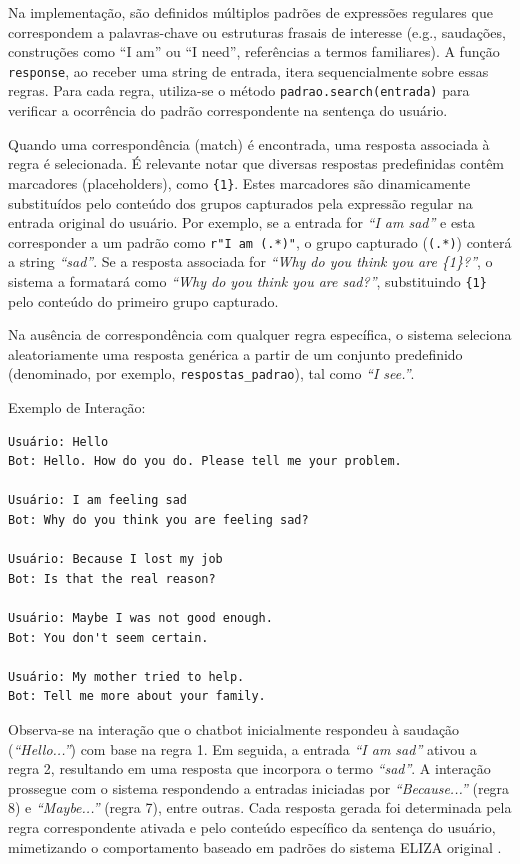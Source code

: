 \documentclass[14pt,a4paper,oneside]{book}
\begin{document}
Na implementação, são definidos múltiplos padrões de expressões regulares que correspondem a palavras-chave ou estruturas frasais de interesse (e.g., saudações, construções como ``I am'' ou ``I need'', referências a termos familiares). A função \texttt{response}, ao receber uma string de entrada, itera sequencialmente sobre essas regras. Para cada regra, utiliza-se o método \texttt{padrao.search(entrada)} para verificar a ocorrência do padrão correspondente na sentença do usuário.

Quando uma correspondência (match) é encontrada, uma resposta associada à regra é selecionada. É relevante notar que diversas respostas predefinidas contêm marcadores (placeholders), como \texttt{\{1\}}. Estes marcadores são dinamicamente substituídos pelo conteúdo dos grupos capturados pela expressão regular na entrada original do usuário. Por exemplo, se a entrada for \textit{``I am sad''} e esta corresponder a um padrão como \texttt{r"I am (.*)"}, o grupo capturado (\texttt{(.*)}) conterá a string \textit{``sad''}. Se a resposta associada for \textit{``Why do you think you are \{1\}?''}, o sistema a formatará como \textit{``Why do you think you are sad?''}, substituindo \texttt{\{1\}} pelo conteúdo do primeiro grupo capturado.

Na ausência de correspondência com qualquer regra específica, o sistema seleciona aleatoriamente uma resposta genérica a partir de um conjunto predefinido (denominado, por exemplo, \texttt{respostas\_padrao}), tal como \textit{``I see.''}.

Exemplo de Interação:

\begin{lstlisting}
Usuário: Hello
Bot: Hello. How do you do. Please tell me your problem.

Usuário: I am feeling sad
Bot: Why do you think you are feeling sad?

Usuário: Because I lost my job
Bot: Is that the real reason?

Usuário: Maybe I was not good enough.
Bot: You don't seem certain.

Usuário: My mother tried to help.
Bot: Tell me more about your family.
\end{lstlisting}

Observa-se na interação que o chatbot inicialmente respondeu à saudação (\textit{``Hello...''}) com base na regra 1. Em seguida, a entrada \textit{``I am sad''} ativou a regra 2, resultando em uma resposta que incorpora o termo \textit{``sad''}. 
A interação prossegue com o sistema respondendo a entradas iniciadas por \textit{``Because...''} (regra 8) e \textit{``Maybe...''} (regra 7), entre outras. 
Cada resposta gerada foi determinada pela regra correspondente ativada e pelo conteúdo específico da sentença do usuário, mimetizando o comportamento baseado em padrões do sistema ELIZA original \cite{Abdul-Kader2015}.
\end{document}
